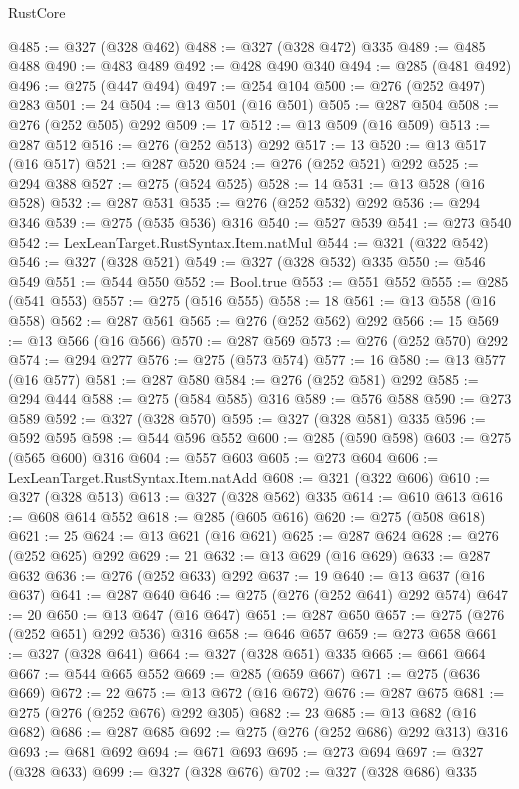\begin{lexlean}{RustCore}
\begin{coremodule}
@485 := @327 (@328 @462)
@488 := @327 (@328 @472) @335
@489 := @485 @488
@490 := @483 @489
@492 := @428 @490 @340
@494 := @285 (@481 @492)
@496 := @275 (@447 @494)
@497 := @254 @104
@500 := @276 (@252 @497) @283
@501 := 24
@504 := @13 @501 (@16 @501)
@505 := @287 @504
@508 := @276 (@252 @505) @292
@509 := 17
@512 := @13 @509 (@16 @509)
@513 := @287 @512
@516 := @276 (@252 @513) @292
@517 := 13
@520 := @13 @517 (@16 @517)
@521 := @287 @520
@524 := @276 (@252 @521) @292
@525 := @294 @388
@527 := @275 (@524 @525)
@528 := 14
@531 := @13 @528 (@16 @528)
@532 := @287 @531
@535 := @276 (@252 @532) @292
@536 := @294 @346
@539 := @275 (@535 @536) @316
@540 := @527 @539
@541 := @273 @540
@542 := LexLeanTarget.RustSyntax.Item.natMul
@544 := @321 (@322 @542)
@546 := @327 (@328 @521)
@549 := @327 (@328 @532) @335
@550 := @546 @549
@551 := @544 @550
@552 := Bool.true
@553 := @551 @552
@555 := @285 (@541 @553)
@557 := @275 (@516 @555)
@558 := 18
@561 := @13 @558 (@16 @558)
@562 := @287 @561
@565 := @276 (@252 @562) @292
@566 := 15
@569 := @13 @566 (@16 @566)
@570 := @287 @569
@573 := @276 (@252 @570) @292
@574 := @294 @277
@576 := @275 (@573 @574)
@577 := 16
@580 := @13 @577 (@16 @577)
@581 := @287 @580
@584 := @276 (@252 @581) @292
@585 := @294 @444
@588 := @275 (@584 @585) @316
@589 := @576 @588
@590 := @273 @589
@592 := @327 (@328 @570)
@595 := @327 (@328 @581) @335
@596 := @592 @595
@598 := @544 @596 @552
@600 := @285 (@590 @598)
@603 := @275 (@565 @600) @316
@604 := @557 @603
@605 := @273 @604
@606 := LexLeanTarget.RustSyntax.Item.natAdd
@608 := @321 (@322 @606)
@610 := @327 (@328 @513)
@613 := @327 (@328 @562) @335
@614 := @610 @613
@616 := @608 @614 @552
@618 := @285 (@605 @616)
@620 := @275 (@508 @618)
@621 := 25
@624 := @13 @621 (@16 @621)
@625 := @287 @624
@628 := @276 (@252 @625) @292
@629 := 21
@632 := @13 @629 (@16 @629)
@633 := @287 @632
@636 := @276 (@252 @633) @292
@637 := 19
@640 := @13 @637 (@16 @637)
@641 := @287 @640
@646 := @275 (@276 (@252 @641) @292 @574)
@647 := 20
@650 := @13 @647 (@16 @647)
@651 := @287 @650
@657 := @275 (@276 (@252 @651) @292 @536) @316
@658 := @646 @657
@659 := @273 @658
@661 := @327 (@328 @641)
@664 := @327 (@328 @651) @335
@665 := @661 @664
@667 := @544 @665 @552
@669 := @285 (@659 @667)
@671 := @275 (@636 @669)
@672 := 22
@675 := @13 @672 (@16 @672)
@676 := @287 @675
@681 := @275 (@276 (@252 @676) @292 @305)
@682 := 23
@685 := @13 @682 (@16 @682)
@686 := @287 @685
@692 := @275 (@276 (@252 @686) @292 @313) @316
@693 := @681 @692
@694 := @671 @693
@695 := @273 @694
@697 := @327 (@328 @633)
@699 := @327 (@328 @676)
@702 := @327 (@328 @686) @335

\end{coremodule}
\end{lexlean}
